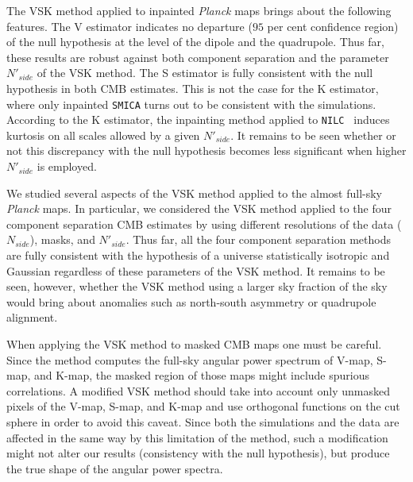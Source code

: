 The VSK method applied to inpainted \textit{Planck} maps brings about the following features. The V estimator indicates no departure ($95$ per cent confidence region) of the null hypothesis at the level of the dipole and the quadrupole. Thus far, these results are robust against both component separation and the parameter $ N'_{side} $ of the VSK method. The S estimator is fully consistent with the null hypothesis in both CMB estimates. This is not the case for the K estimator, where only inpainted \texttt{SMICA} turns out to be consistent with the simulations. According to the K estimator, the inpainting method applied to \texttt{NILC } induces kurtosis on all scales allowed by a given $ N'_{side} $. It remains to be seen  whether or not this discrepancy with the null hypothesis becomes  less significant when higher $ N'_{side} $ is employed.  

We studied several aspects of the VSK method applied to the almost full-sky \textit{Planck} maps. In particular, we considered the VSK method applied to the four component separation CMB estimates by using different resolutions of the data ($ N_{side} $), masks, and $ N'_{side} $. Thus far, all the four component separation methods are fully consistent with the hypothesis of a universe statistically isotropic and Gaussian regardless of these parameters of the VSK method. It remains to be seen, however, whether the VSK method using a larger sky fraction of the sky would bring about anomalies such as north-south asymmetry or quadrupole alignment.    

When applying the VSK method to masked CMB maps one must be careful. Since the method computes the full-sky angular power spectrum of V-map, S-map, and K-map, the masked region of those maps might include spurious correlations. %
A modified VSK method should take into account only unmasked pixels of the V-map, S-map, and K-map and use orthogonal functions on the cut sphere in order to avoid this caveat. Since both the simulations and the data are affected in the same way by this limitation of the method, such a modification might not alter our results (consistency with the null hypothesis), but produce the true shape of the angular power spectra.  

